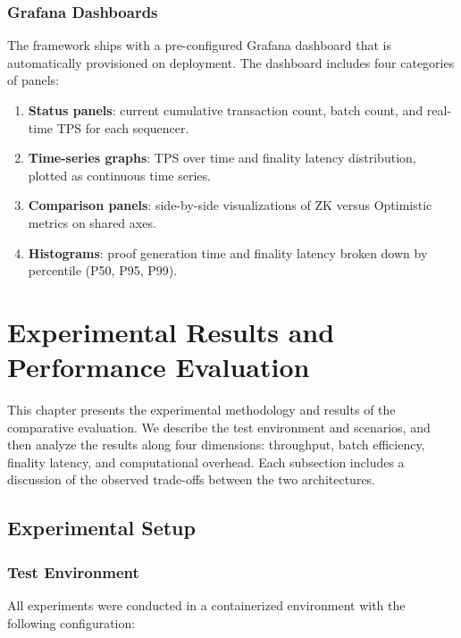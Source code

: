 \documentclass[
]{elteikthesis}[2024/04/26]
\begin{document}
\subsection{Grafana Dashboards}

The framework ships with a pre-configured Grafana dashboard that is automatically provisioned on deployment. The dashboard includes four categories of panels:

\begin{enumerate}
    \item \textbf{Status panels}: current cumulative transaction count, batch count, and real-time TPS for each sequencer.
    \item \textbf{Time-series graphs}: TPS over time and finality latency distribution, plotted as continuous time series.
    \item \textbf{Comparison panels}: side-by-side visualizations of ZK versus Optimistic metrics on shared axes.
    \item \textbf{Histograms}: proof generation time and finality latency broken down by percentile (P50, P95, P99).
\end{enumerate}

\cleardoublepage

\chapter{Experimental Results and Performance Evaluation}
\label{ch:evaluation}

This chapter presents the experimental methodology and results of the comparative evaluation. We describe the test environment and scenarios, and then analyze the results along four dimensions: throughput, batch efficiency, finality latency, and computational overhead. Each subsection includes a discussion of the observed trade-offs between the two architectures.

\section{Experimental Setup}

\subsection{Test Environment}

All experiments were conducted in a containerized environment with the following configuration:
\end{document}

